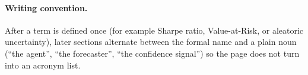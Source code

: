 \paragraph{Writing convention.} After a term is defined once (for example Sharpe ratio, Value-at-Risk, or aleatoric uncertainty), later sections alternate between the formal name and a plain noun (``the agent'', ``the forecaster'', ``the confidence signal'') so the page does not turn into an acronym list.

\clearpage
